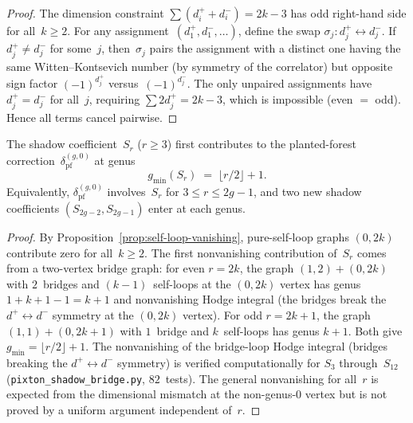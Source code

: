 \begin{proof}
The dimension constraint
$\sum (d_i^+ + d_i^-) = 2k - 3$ has odd right-hand side for all~$k \geq 2$.
For any assignment~$(d_1^+,d_1^-,\ldots)$, define the swap
$\sigma_j\colon d_j^+ \leftrightarrow d_j^-$.
If $d_j^+ \neq d_j^-$ for some~$j$, then~$\sigma_j$ pairs the
assignment with a distinct one having the same Witten--Kontsevich number
(by symmetry of the correlator) but opposite sign factor
$(-1)^{d_j^+}$ versus~$(-1)^{d_j^-}$.
The only unpaired assignments have $d_j^+ = d_j^-$ for all~$j$,
requiring $\sum 2d_j^+ = 2k-3$, which is impossible
(even $=$ odd).
Hence all terms cancel pairwise.
\end{proof}

\begin{corollary}
\label{cor:shadow-visibility-genus}
\ClaimStatusProvedHere
{}
The shadow coefficient~$S_r$ ($r \geq 3$) first contributes to the
planted-forest correction~$\delta_{\mathrm{pf}}^{(g,0)}$ at genus
\begin{equation}\label{eq:shadow-visibility-genus}
g_{\min}(S_r) \;=\; \lfloor r/2 \rfloor + 1.
\end{equation}
Equivalently, $\delta_{\mathrm{pf}}^{(g,0)}$ involves~$S_r$
for $3 \leq r \leq 2g-1$, and two new shadow coefficients
$(S_{2g-2}, S_{2g-1})$ enter at each genus.
\end{corollary}

\begin{proof}
By Proposition~\ref{prop:self-loop-vanishing}, pure-self-loop graphs
$(0,2k)$ contribute zero for all~$k \geq 2$.
The first nonvanishing contribution of~$S_r$ comes from a two-vertex
bridge graph: for even $r = 2k$, the graph
$(1,2) + (0,2k)$ with $2$~bridges and $(k{-}1)$~self-loops at the
$(0,2k)$ vertex has genus $1 + k + 1 - 1 = k + 1$
and nonvanishing Hodge integral (the bridges break the
$d^+ \leftrightarrow d^-$ symmetry at the $(0,2k)$ vertex).
For odd $r = 2k{+}1$, the graph $(1,1) + (0,2k{+}1)$ with
$1$~bridge and $k$~self-loops has genus $k+1$.
Both give $g_{\min} = \lfloor r/2 \rfloor + 1$.
The nonvanishing of the bridge-loop Hodge integral
(bridges breaking the $d^+\!\leftrightarrow d^-$ symmetry) is
verified computationally for $S_3$ through~$S_{12}$
(\texttt{pixton\_shadow\_bridge.py}, $82$~tests).
The general nonvanishing for all~$r$ is expected from the
dimensional mismatch at the non-genus-$0$ vertex but is not
proved by a uniform argument independent of~$r$.
\end{proof}

